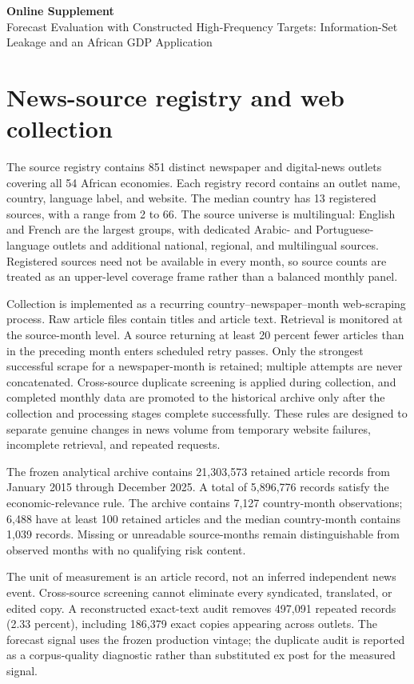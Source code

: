 \documentclass[12pt]{article}
\begin{document}
\begin{center}
{\Large \textbf{Online Supplement}}\\[0.5em]
{\large Forecast Evaluation with Constructed High-Frequency Targets: Information-Set Leakage and an African GDP Application}
\end{center}

\section{News-source registry and web collection}
The source registry contains 851 distinct newspaper and digital-news outlets covering all 54 African economies. Each registry record contains an outlet name, country, language label, and website. The median country has 13 registered sources, with a range from 2 to 66. The source universe is multilingual: English and French are the largest groups, with dedicated Arabic- and Portuguese-language outlets and additional national, regional, and multilingual sources. Registered sources need not be available in every month, so source counts are treated as an upper-level coverage frame rather than a balanced monthly panel.

Collection is implemented as a recurring country--newspaper--month web-scraping process. Raw article files contain titles and article text. Retrieval is monitored at the source-month level. A source returning at least 20 percent fewer articles than in the preceding month enters scheduled retry passes. Only the strongest successful scrape for a newspaper-month is retained; multiple attempts are never concatenated. Cross-source duplicate screening is applied during collection, and completed monthly data are promoted to the historical archive only after the collection and processing stages complete successfully. These rules are designed to separate genuine changes in news volume from temporary website failures, incomplete retrieval, and repeated requests.

The frozen analytical archive contains 21,303,573 retained article records from January 2015 through December 2025. A total of 5,896,776 records satisfy the economic-relevance rule. The archive contains 7,127 country-month observations; 6,488 have at least 100 retained articles and the median country-month contains 1,039 records. Missing or unreadable source-months remain distinguishable from observed months with no qualifying risk content.

The unit of measurement is an article record, not an inferred independent news event. Cross-source screening cannot eliminate every syndicated, translated, or edited copy. A reconstructed exact-text audit removes 497,091 repeated records (2.33 percent), including 186,379 exact copies appearing across outlets. The forecast signal uses the frozen production vintage; the duplicate audit is reported as a corpus-quality diagnostic rather than substituted ex post for the measured signal.
\end{document}
